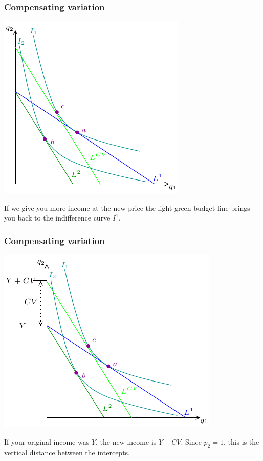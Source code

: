 \documentclass[xcolor=pdftex,dvipsnames]{beamer}
\begin{document}
\begin{frame}
\frametitle{Compensating variation}
\begin{center}
\includegraphics{pics/CVEV3}
\end{center}
If we give you more income at the new price the light green budget
line brings you back to the indifference curve $I^1$.
\end{frame}

\begin{frame}
\frametitle{Compensating variation}
\begin{center}
\includegraphics{pics/CVEV4}
\end{center}
If your original income was $Y$, the new income is $Y+CV$.
Since $p_2=1$, this is the vertical distance between the intercepts.\end{frame}
\end{document}
